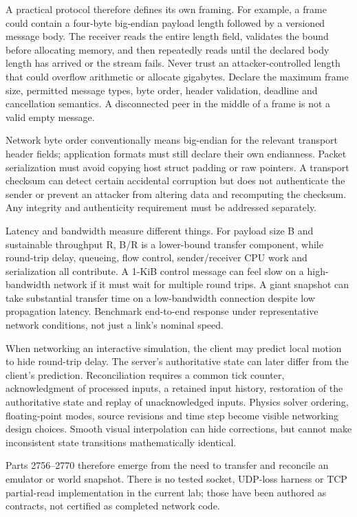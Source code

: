 A practical protocol therefore defines its own framing. For example, a frame could contain a four-byte big-endian payload length followed by a versioned message body. The receiver reads the entire length field, validates the bound before allocating memory, and then repeatedly reads until the declared body length has arrived or the stream fails. Never trust an attacker-controlled length that could overflow arithmetic or allocate gigabytes. Declare the maximum frame size, permitted message types, byte order, header validation, deadline and cancellation semantics. A disconnected peer in the middle of a frame is not a valid empty message.

Network byte order conventionally means big-endian for the relevant transport header fields; application formats must still declare their own endianness. Packet serialization must avoid copying host struct padding or raw pointers. A transport checksum can detect certain accidental corruption but does not authenticate the sender or prevent an attacker from altering data and recomputing the checksum. Any integrity and authenticity requirement must be addressed separately.

Latency and bandwidth measure different things. For payload size B and sustainable throughput R, B/R is a lower-bound transfer component, while round-trip delay, queueing, flow control, sender/receiver CPU work and serialization all contribute. A 1-KiB control message can feel slow on a high-bandwidth network if it must wait for multiple round trips. A giant snapshot can take substantial transfer time on a low-bandwidth connection despite low propagation latency. Benchmark end-to-end response under representative network conditions, not just a link's nominal speed.

When networking an interactive simulation, the client may predict local motion to hide round-trip delay. The server's authoritative state can later differ from the client's prediction. Reconciliation requires a common tick counter, acknowledgment of processed inputs, a retained input history, restoration of the authoritative state and replay of unacknowledged inputs. Physics solver ordering, floating-point modes, source revisions and time step become visible networking design choices. Smooth visual interpolation can hide corrections, but cannot make inconsistent state transitions mathematically identical.

Parts 2756--2770 therefore emerge from the need to transfer and reconcile an emulator or world snapshot. There is no tested socket, UDP-loss harness or TCP partial-read implementation in the current lab; those have been authored as contracts, not certified as completed network code.

